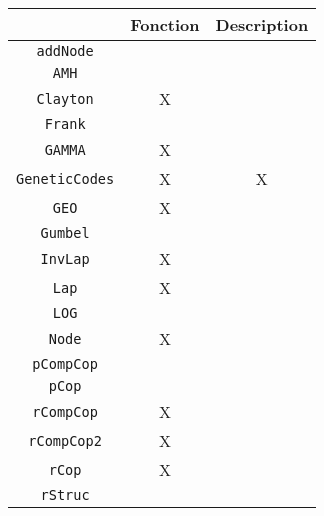 \documentclass[11pt, french]{article}
\begin{document}
\begin{figure}[H]
  \centering
  \begin{tabular}{||c|c|c||}
  \hline
  {} & \textbf{Fonction} & \textbf{Description} \\
  \hline
  \texttt{addNode} &  &  \\
  \hline
  \texttt{AMH} &  &\\
  \hline
  \texttt{Clayton} & X &  \\
  \hline
  \texttt{Frank} &  &  \\
  \hline
  \texttt{GAMMA} & X & \\
  \hline
  \texttt{GeneticCodes} & X & X \\
  \hline
  \texttt{GEO} & X & \\
  \hline
  \texttt{Gumbel} & & \\
  \hline
  \texttt{InvLap} & X & \\
  \hline
  \texttt{Lap} & X & \\
  \hline
  \texttt{LOG} & & \\
  \hline
  \texttt{Node} & X & \\
  \hline
  \texttt{pCompCop} & & \\
  \hline
  \texttt{pCop} & & \\
  \hline
  \texttt{rCompCop} & X & \\
  \hline
  \texttt{rCompCop2} & X & \\
  \hline
  \texttt{rCop} & X & \\
  \hline
  \texttt{rStruc} & & \\
  \hline
  \end{tabular}
\end{figure}
\end{document}
